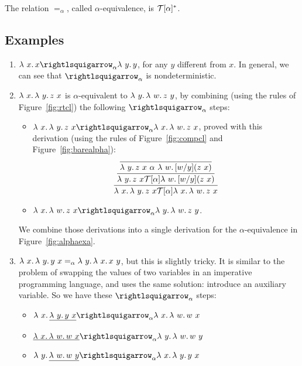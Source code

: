 \begin{definition}
\label{def:alpha}
  The relation $=_\alpha$, called $\alpha$-equivalence, is $\mathcal{T}[\alpha]^*$.
  \end{definition}

\subsection{Examples}

\begin{enumerate}
\item $\lam{x}{x} \curva_\alpha \lam{y}{y}$, for any $y$ different from $x$.  In general, we can see that $\curva_\alpha$ is nondeterministic.
\item $\lambda\ x.\, \lambda\ y.\, z\ x$ is $\alpha$-equivalent to $\lambda\ y.\, \lambda\ w.\, z\ y$, by combining (using the rules of Figure~\ref{fig:rtcl})
  the following $\curva_\alpha$ steps:
  \begin{itemize}
  \item $\lam{x}{\lam{y}{z\ x}} \curva_\alpha \lam{x}{\lam{w}{z\ x}}$, proved with this derivation (using the rules of Figure~\ref{fig:compcl} and Figure~\ref{fig:barealpha}):
    \[
    \infer{\lam{x}{\lam{y}{z\ x}} \Tau[\alpha] \lam{x}{\lam{w}{z\ x}}}
          {\infer{\lam{y}{z\ x} \Tau[\alpha] \lam{w}{[w/y](z\ x)}}{\infer{\lam{y}{z\ x} \ \alpha \ \lam{w}{[w/y](z\ x)} }{\ }}}
          \]
    
    \item $\lam{x}{\lam{w}{z\ x}} \curva_\alpha \lam{y}{\lam{w}{z\ y}}$.
          
  \end{itemize}
  We combine those derivations into a single derivation for the $\alpha$-equivalence in Figure~\ref{fig:alphaexa}.
\item $\lambda\ x.\, \lambda\ y.\, y\ x =_\alpha \lambda\ y.\, \lambda\ x.\, x\ y$, but this is slightly tricky.  It is similar to the problem of swapping the values of two variables in an imperative programming language, and uses the same solution: introduce an auxiliary variable.  So we have these $\curva_\alpha$ steps:
  \begin{itemize}
  \item $\lam{x}{\underline{\lam{y}{y\ x}}} \curva_\alpha \lam{x}{\lam{w}{w\ x}}$
  \item $\underline{\lam{x}{\lam{w}{w\ x}}} \curva_\alpha \lam{y}{\lam{w}{w\ y}}$
  \item $\lam{y}{\underline{\lam{w}{w\ y}}} \curva_\alpha \lam{x}{\lam{y}{y\ x}}$
    \end{itemize}
\end{enumerate}

